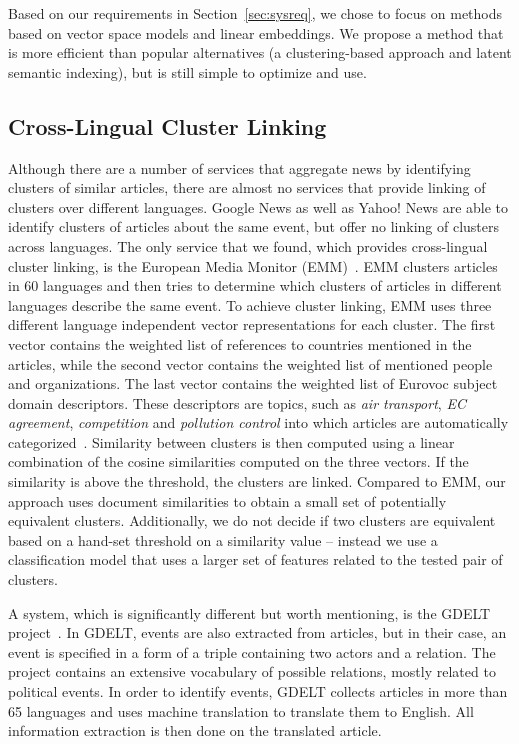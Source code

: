 \documentclass[twoside,11pt]{article}
\begin{document}
Based on our requirements in Section~\ref{sec:sysreq}, we chose to focus on methods based on vector space models and linear embeddings. We propose a method that is more efficient than popular alternatives (a clustering-based approach and latent semantic indexing), but is still simple to optimize and use.

\subsection{Cross-Lingual Cluster Linking}

Although there are a number of services that aggregate news by identifying clusters of similar articles, there are almost no services that provide linking of clusters over different languages. Google News as well as Yahoo! News are able to identify clusters of articles about the same event, but offer no linking of clusters across languages. The only service that we found, which provides cross-lingual cluster linking, is the European Media Monitor (EMM)~\cite{pouliquen2008story,Steinberger2008}. EMM clusters articles in 60 languages and then tries to determine which clusters of articles in different languages describe the same event. To achieve cluster linking, EMM uses three different language independent vector representations for each cluster. The first vector contains the weighted list of references to countries mentioned in the articles, while the second vector contains the weighted list of mentioned people and organizations. The last vector contains the weighted list of Eurovoc subject domain descriptors. These descriptors are topics, such as \emph{air transport}, \emph{EC agreement}, \emph{competition} and \emph{pollution control} into which articles are automatically categorized~. Similarity between clusters is then computed using a linear combination of the cosine similarities computed on the three vectors. If the similarity is above the threshold, the clusters are linked. Compared to EMM, our approach uses document similarities to obtain a small set of potentially equivalent clusters. Additionally, we do not decide if two clusters are equivalent based on a hand-set threshold on a similarity value -- instead we use a classification model that uses a larger set of features related to the tested pair of clusters.

\begin{sloppypar}
A system, which is significantly different but worth mentioning, is the GDELT project~\cite{Leetaru2013Gdelt}. In GDELT, events are also extracted from articles, but in their case, an event is specified in a form of a triple containing two actors and a relation. The project contains an extensive vocabulary of possible relations, mostly related to political events. In order to identify events, GDELT collects articles in more than 65 languages and uses machine translation to translate them to English. All information extraction is then done on the translated article.
\end{sloppypar}
\end{document}
